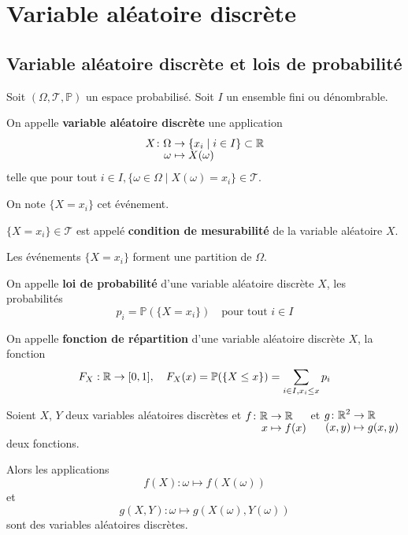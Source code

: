 \documentclass[a4paper, 12pt]{article}
\begin{document}
\section{Variable aléatoire discrète}

\subsection{Variable aléatoire discrète et lois de probabilité}

\begin{definition}
    Soit $(\Omega, \mathcal{T}, \mathbb{P})$ un espace probabilisé. Soit $I$ un ensemble fini ou dénombrable.

    On appelle \textbf{variable aléatoire discrète} une application
    $$
    \funcdef{X}{\Omega}{\{x_i \mid i \in I\} \subset \R}{\omega}{X(\omega)}
    $$ 
    telle que pour tout $i \in I, \{ \omega \in \Omega \mid X(\omega) = x_i \} \in \mathcal{T}$.

    On note $\{ X = x_i \}$ cet événement.
\end{definition}

\begin{remarque}
    $\{ X = x_i \} \in \mathcal{T}$ est appelé \textbf{condition de mesurabilité} de la variable aléatoire $X$.
\end{remarque}

\begin{proposition}{}{}
    Les événements $\{ X = x_i \}$ forment une partition de $\Omega$.
\end{proposition}

\begin{demonstration}
\end{demonstration}

\begin{definition}
    On appelle \textbf{loi de probabilité} d'une variable aléatoire discrète $X$, les probabilités
    $$
    p_i = \mathbb{P}(\{ X = x_i \}) \quad \text{pour tout } i \in I
    $$
\end{definition}

\begin{definition}
    On appelle \textbf{fonction de répartition} d'une variable aléatoire discrète $X$, la fonction
    $$
    F_X : \mathbb{R} \to [0, 1], \quad F_X(x) = \mathbb{P}(\{ X \leq x \}) = \sum_{i \in I, x_i \leq x} p_i
    $$
\end{definition}

\begin{theoreme}{}{}
    Soient $X$, $Y$ deux variables aléatoires discrètes et $\funcdef{f}{\R}{\R}{x}{f(x)}$ et $\funcdef{g}{\R^2}{\R}{(x, y)}{g(x, y)}$ deux fonctions.

    Alors les applications
    $$
    f(X): \omega \mapsto f(X(\omega))
    $$
    et
    $$
    g(X, Y): \omega \mapsto g(X(\omega), Y(\omega))
    $$
    sont des variables aléatoires discrètes.
\end{theoreme}
\end{document}
